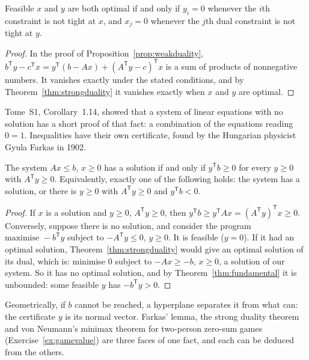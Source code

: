 \begin{corollary}\label{cor:compslack}
Feasible $x$ and $y$ are both optimal if and only if $y_i=0$ whenever the $i$th constraint is not tight at $x$, and $x_j=0$ whenever the $j$th dual constraint is not tight at $y$.
\end{corollary}
\begin{proof}
In the proof of Proposition~\ref{prop:weakduality}, $b^{\mathsf T}y-c^{\mathsf T}x=y^{\mathsf T}(b-Ax)+(A^{\mathsf T}y-c)^{\mathsf T}x$ is a sum of products of nonnegative numbers. It vanishes exactly under the stated conditions,
and by Theorem~\ref{thm:strongduality} it vanishes exactly when $x$ and $y$ are optimal.
\end{proof}

Tome~S1, Corollary~1.14, showed that a system of linear equations with no solution has a short proof of that fact: a combination of the equations reading $0=1$. Inequalities have their own certificate, found by the
Hungarian physicist Gyula Farkas in 1902.

\begin{corollary}\label{cor:farkas}
The system $Ax\le b$, $x\ge0$ has a solution if and only if $y^{\mathsf T}b\ge0$ for every $y\ge0$ with $A^{\mathsf T}y\ge0$. Equivalently, exactly one of the following holds: the system has a solution, or there is
$y\ge0$ with $A^{\mathsf T}y\ge0$ and $y^{\mathsf T}b<0$.
\end{corollary}
\begin{proof}
If $x$ is a solution and $y\ge0$, $A^{\mathsf T}y\ge0$, then $y^{\mathsf T}b\ge y^{\mathsf T}Ax=(A^{\mathsf T}y)^{\mathsf T}x\ge0$. Conversely, suppose there is no solution, and consider the program
$\text{maximise }-b^{\mathsf T}y$ subject to $-A^{\mathsf T}y\le0$, $y\ge0$. It is feasible ($y=0$). If it had an optimal solution, Theorem~\ref{thm:strongduality} would give an optimal solution of its dual, which is:
minimise $0$ subject to $-Ax\ge-b$, $x\ge0$, a solution of our system. So it has no optimal solution, and by Theorem~\ref{thm:fundamental} it is unbounded: some feasible $y$ has $-b^{\mathsf T}y>0$.
\end{proof}

Geometrically, if $b$ cannot be reached, a hyperplane separates it from what can: the certificate $y$ is its normal vector. Farkas' lemma, the strong duality theorem and von Neumann's minimax theorem for two-person
zero-sum games (Exercise~\ref{ex:gamevalue}) are three faces of one fact, and each can be deduced from the others.


